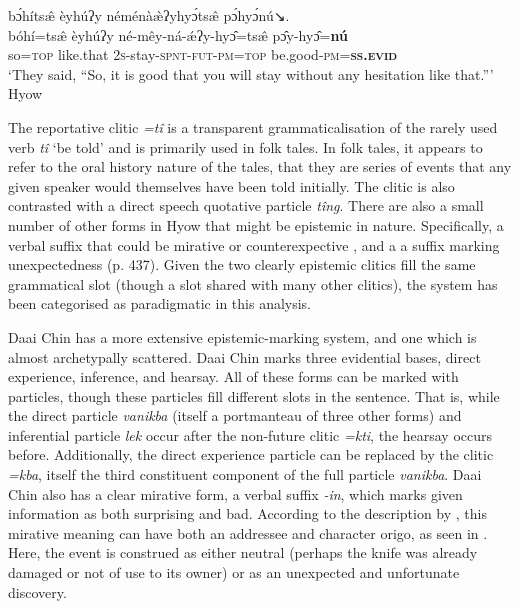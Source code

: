 \begin{exe}
\ex\label{e:History:Hyow}
\glll bɔ́hítsæ̂ èyhúʔy néménàæ̀ʔyhyɔ́tsæ̂ pɔ́hyɔ́nú↘. \\
bóhí=tsæ̂ èyhúʔy né-mêy-ná-ǽʔy-hyɔ̂=tsæ̂ pɔ̂y-hyɔ̂=\textbf{nú} \\
so=\textsc{top} like.that \textsc{2s}-stay-\textsc{spnt-fut-pm=top} be.good\textsc{-pm=\textbf{ss.evid}} \\
\glt `They said, ``So, it is good that you will stay without any hesitation like that.''' Hyow \cite[Kukish: Myanmar,][487]{Zakaria2018}
\end{exe}

The reportative clitic \textit{=tî} is a transparent grammaticalisation of the rarely used verb \textit{tî} `be told' and is primarily used in folk tales. In folk tales, it appears to refer to the oral history nature of the tales, that they are series of events that any given speaker would themselves have been told initially. The clitic is also contrasted with a direct speech quotative particle \textit{tîng}. There are also a small number of other forms in Hyow that might be epistemic in nature. Specifically, a verbal suffix that could be mirative or counterexpective \cite[440]{Zakaria2018}, and a a suffix marking unexpectedness (p. 437). Given the two clearly epistemic clitics fill the same grammatical slot (though a slot shared with many other clitics), the system has been categorised as paradigmatic in this analysis.

Daai Chin \cite[Kukish: Myanmar,][294]{SoHartmann2009} has a more extensive epistemic-marking system, and one which is almost archetypally scattered. Daai Chin marks three evidential bases, direct experience, inference, and hearsay. All of these forms can be marked with particles, though these particles fill different slots in the sentence. That is, while the direct particle \textit{vanikba} (itself a portmanteau of three other forms) and inferential particle \textit{lek} occur after the non-future clitic \textit{=kti}, the hearsay occurs before. Additionally, the direct experience particle can be replaced by the clitic \textit{=kba}, itself the third constituent component of the full particle \textit{vanikba}. Daai Chin also has a clear mirative form, a verbal suffix \textit{-in}, which marks given information as both surprising and bad. According to the description by , this mirative meaning can have both an addressee and character origo, as seen in . Here, the event is construed as either neutral (perhaps the knife was already damaged or not of use to its owner) or as an unexpected and unfortunate discovery.

